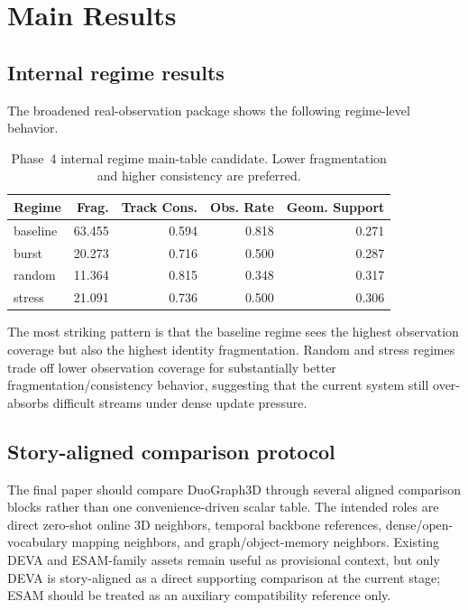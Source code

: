\documentclass[11pt]{article}
\begin{document}
\section{Main Results}
\subsection{Internal regime results}
The broadened real-observation package shows the following regime-level behavior.

\begin{table}[t]
\centering
\small
\begin{tabular}{lrrrr}
\toprule
Regime & Frag. & Track Cons. & Obs. Rate & Geom. Support\\
\midrule
baseline & 63.455 & 0.594 & 0.818 & 0.271\\
burst    & 20.273 & 0.716 & 0.500 & 0.287\\
random   & 11.364 & 0.815 & 0.348 & 0.317\\
stress   & 21.091 & 0.736 & 0.500 & 0.306\\
\bottomrule
\end{tabular}
\caption{Phase~4 internal regime main-table candidate. Lower fragmentation and higher consistency are preferred.}
\end{table}

The most striking pattern is that the baseline regime sees the highest observation coverage but also the highest identity fragmentation. Random and stress regimes trade off lower observation coverage for substantially better fragmentation/consistency behavior, suggesting that the current system still over-absorbs difficult streams under dense update pressure.

\subsection{Story-aligned comparison protocol}
The final paper should compare DuoGraph3D through several aligned comparison blocks rather than one convenience-driven scalar table. The intended roles are direct zero-shot online 3D neighbors, temporal backbone references, dense/open-vocabulary mapping neighbors, and graph/object-memory neighbors. Existing DEVA and ESAM-family assets remain useful as provisional context, but only DEVA is story-aligned as a direct supporting comparison at the current stage; ESAM should be treated as an auxiliary compatibility reference only.
\end{document}
